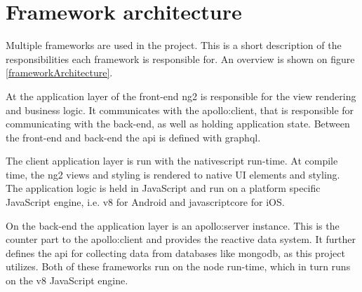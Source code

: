 \chapter{Framework architecture}

Multiple frameworks are used in the project. 
This is a short description of the responsibilities each framework is responsible for. 
An overview is shown on figure \ref{frameworkArchitecture}.

At the application layer of the front-end \gls{ng2} is responsible for the view rendering and business logic. 
It communicates with the \gls{apollo:client}, that is responsible for communicating with the back-end, as well as holding application state. 
Between the front-end and back-end the \gls{api} is defined with \gls{graphql}.

The client application layer is run with the \gls{nativescript} run-time. 
At compile time, the \gls{ng2} views and styling is rendered to native UI elements and styling. 
The application logic is held in JavaScript and run on a platform specific JavaScript engine, i.e. \gls{v8} for Android and \gls{javascriptcore} for iOS.

On the back-end the application layer is an \gls{apollo:server} instance. 
This is the counter part to the \gls{apollo:client} and provides the reactive data system. 
It further defines the \gls{api} for collecting data from databases like \gls{mongodb}, as this project utilizes.
Both of these frameworks run on the \gls{node} run-time, which in turn runs on the \gls{v8} JavaScript engine.

